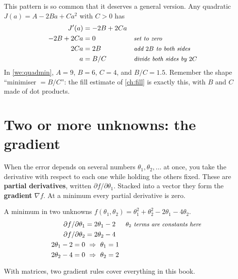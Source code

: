 \documentclass[11pt,a4paper,oneside,openany]{book}
\newcommand{\why}[1]{&&\text{\small\itshape #1}}
\begin{document}
This pattern is so common that it deserves a general version. Any quadratic $J(a)=A-2Ba+Ca^2$ with $C>0$ has
\begin{align*}
J'(a) &= -2B+2Ca\\
-2B+2Ca &= 0 \why{set to zero}\\
2Ca &= 2B \why{add $2B$ to both sides}\\
a &= B/C \why{divide both sides by $2C$}
\end{align*}
In \cref{we:quadmin}, $A=9$, $B=6$, $C=4$, and $B/C=1.5$. Remember the shape ``minimiser $=B/C$'': the fill estimate of
\cref{ch:fill} is exactly this, with $B$ and $C$ made of dot products.

\section{Two or more unknowns: the gradient}

When the error depends on several numbers $\theta_1,\theta_2,\dots$ at once, you take the derivative with respect to each one
while holding the others fixed. These are \textbf{partial derivatives}, written $\partial f/\partial\theta_1$. Stacked into a
vector they form the \textbf{gradient} $\nabla f$. At a minimum every partial derivative is zero.

\begin{worked}[label=we:grad]{A minimum in two unknowns}
$f(\theta_1,\theta_2)=\theta_1^2+\theta_2^2-2\theta_1-4\theta_2$.
\begin{align*}
\partial f/\partial\theta_1 &= 2\theta_1-2 \why{$\theta_2$ terms are constants here}\\
\partial f/\partial\theta_2 &= 2\theta_2-4\\
2\theta_1-2=0 &\ \Rightarrow\ \theta_1=1\\
2\theta_2-4=0 &\ \Rightarrow\ \theta_2=2
\end{align*}
\end{worked}

With matrices, two gradient rules cover everything in this book.
\end{document}
